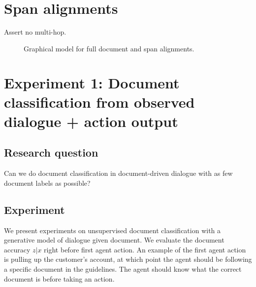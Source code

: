 \documentclass[11pt]{article}
\begin{document}
\section{Span alignments}
Assert no multi-hop.

\begin{figure}[t]
\begin{center}
\end{center}
\caption{Graphical model for full document and span alignments.
}
\label{fig:pgm-sent}
\end{figure}

\section{Experiment 1: Document classification from observed dialogue + action output}
\subsection{Research question}
Can we do document classification in document-driven dialogue with as few document labels as possible?

\subsection{Experiment}
We present experiments on
unsupervised document classification with a generative model of dialogue given document.
We evaluate the document accuracy $z|x$ right before first agent action.
An example of the first agent action is pulling up the customer's account,
at which point the agent should be following a specific document in the guidelines.
The agent should know what the correct document is before taking an action.
\end{document}
